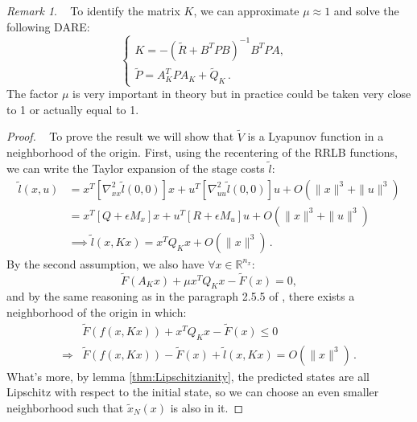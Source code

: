 \documentclass[conference]{IEEEtran}
\theoremstyle{definition}
\theoremstyle{remark}
\newtheorem*{remark}{Remark}
\newcommand{\R}{\mathbb{R}}
\begin{document}
\begin{remark}~
	To identify the matrix $K$, we can approximate $\mu\approx 1$ and solve the following DARE:
	\begin{equation}
		\label{eq:modified-DARE}
		\begin{cases}
			K=-(\tilde{R}+B^TP B)^{-1}B^TP A,&\\
			\tilde{P}=A_K^TP A_K+\tilde{Q}_K\,.
		\end{cases}
	\end{equation}
	The factor $\mu$ is very important in theory but in practice could be taken very close to 1 or actually equal to 1.
\end{remark}

\begin{proof}~
	To prove the result we will show that $\tilde{V}$ is a Lyapunov function in a neighborhood of the origin.
	First, using the recentering of the RRLB functions, we can write the Taylor expansion of the stage costs $\tilde{l}$:
	\begin{align*}
		\tilde{l}(x,u)&=x^T[\nabla_{xx}^2\tilde{l}(0,0)] x+u^T[\nabla_{uu}^2\tilde{l}(0,0)]u+O(\|x\|^3+\|u\|^3)\\
		&=x^T[Q+\epsilon M_x]x+u^T[R+\epsilon M_u]u+O(\|x\|^3+\|u\|^3)\\
		&\implies\tilde{l}(x,Kx)=x^TQ_Kx+O(\|x\|^3)\,.
	\end{align*}
	By the second assumption, we also have $\forall x\in\R^{n_x}$:
	\begin{equation}
		\tilde{F}(A_Kx)+\mu x^T Q_K x-\tilde{F}(x)=0,
	\end{equation}
	and by the same reasoning as in the paragraph 2.5.5 of \cite{MPC-book}, there exists a neighborhood of the origin in which:
	\begin{align}
		&\tilde{F}(f(x,Kx))+x^T Q_K x-\tilde{F}(x)\leq 0\\
		\Longrightarrow&\tilde{F}(f(x,Kx))-\tilde{F}(x)+\tilde{l}(x,Kx)=O(\|x\|^3)\,.
	\end{align}
	What's more, by lemma \ref{thm:Lipschitzianity}, the predicted states are all Lipschitz with respect to the initial state, so we can choose an even smaller neighborhood such that $\tilde{x}_N(x)$ is also in it.


\end{proof}
\end{document}
